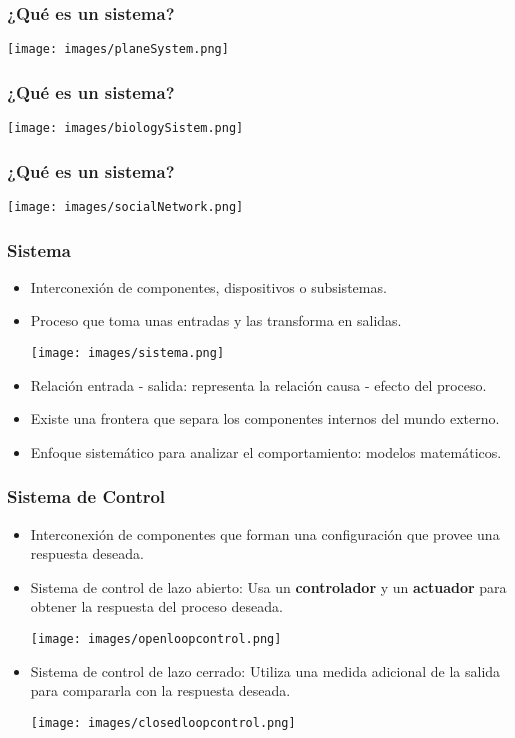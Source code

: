 \documentclass[aspectratio=169]{beamer}
\theoremstyle{definition}
\theoremstyle{plain}
\theoremstyle{remark}
\begin{document}
\begin{frame}[<+->][c]\frametitle{¿Qué es un sistema?}
\begin{center}
  \texttt{[image: images/planeSystem.png]}
\end{center}  
\end{frame}

\begin{frame}[<+->][c]\frametitle{¿Qué es un sistema?}
\begin{center}
  \texttt{[image: images/biologySistem.png]}
\end{center}  
\end{frame}

\begin{frame}[<+->][c]\frametitle{¿Qué es un sistema?}
\begin{center}
  \texttt{[image: images/socialNetwork.png]}
\end{center}  
\end{frame}

\begin{frame}[<+->][c]\frametitle{Sistema}
\begin{itemize}
  \item Interconexión de componentes, dispositivos o subsistemas.
  \item Proceso que toma unas entradas y las transforma en salidas.
  \begin{center}
    \texttt{[image: images/sistema.png]}
  \end{center}
  \item Relación entrada - salida: representa la relación causa - efecto del proceso.
  \item Existe una frontera que separa los componentes internos del mundo externo.
  \item Enfoque sistemático para analizar el comportamiento: modelos matemáticos.
\end{itemize} 
\end{frame}

\begin{frame}[<+->][c]\frametitle{Sistema de Control}
\begin{itemize}
  \item Interconexión de componentes que forman una configuración que provee una respuesta deseada.
  \item Sistema de control de lazo abierto: Usa un \textbf{controlador} y un \textbf{actuador} para obtener la respuesta del proceso deseada.
  \begin{center}
    \texttt{[image: images/openloopcontrol.png]}
  \end{center}  
  \item Sistema de control de lazo cerrado: Utiliza una medida adicional de la salida para compararla con la respuesta deseada.
  \begin{center}
    \texttt{[image: images/closedloopcontrol.png]}
  \end{center}  
\end{itemize}
\end{frame}
\end{document}
